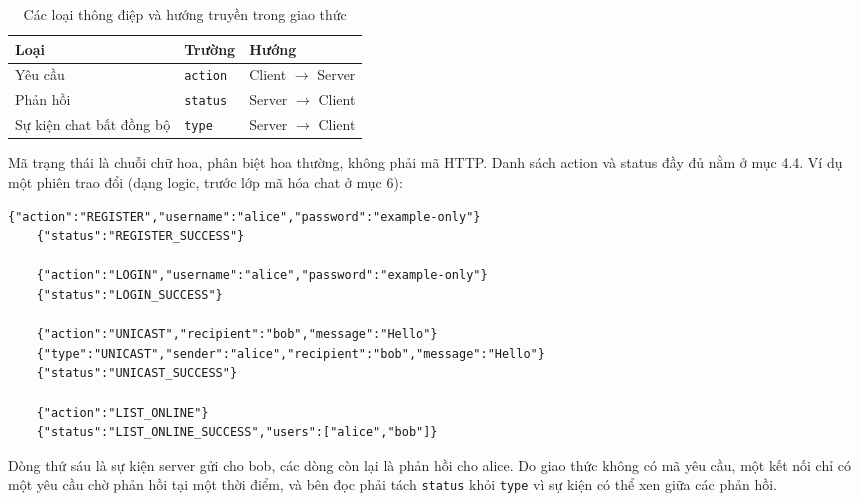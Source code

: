 \begin{table}[H]
    \centering
    \renewcommand{\arraystretch}{1.3}

    \begin{tabular}{@{} l l l @{}}
        \toprule
        \textbf{Loại} & \textbf{Trường} & \textbf{Hướng} \\
        \midrule
        Yêu cầu                  & \texttt{action} & Client $\rightarrow$ Server \\
        Phản hồi                 & \texttt{status} & Server $\rightarrow$ Client \\
        Sự kiện chat bất đồng bộ & \texttt{type}   & Server $\rightarrow$ Client \\
        \bottomrule
    \end{tabular}
    \caption{Các loại thông điệp và hướng truyền trong giao thức}
\end{table}

Mã trạng thái là chuỗi chữ hoa, phân biệt hoa thường, không phải mã HTTP. Danh sách action và status đầy đủ nằm ở mục 4.4. Ví dụ một phiên trao đổi (dạng logic, trước lớp mã hóa chat ở mục 6):

\begin{lstlisting}[style=json, caption={Ví dụ trao đổi thông điệp JSON giữa Client và Server}]
    {"action":"REGISTER","username":"alice","password":"example-only"}
    {"status":"REGISTER_SUCCESS"}

    {"action":"LOGIN","username":"alice","password":"example-only"}
    {"status":"LOGIN_SUCCESS"}

    {"action":"UNICAST","recipient":"bob","message":"Hello"}
    {"type":"UNICAST","sender":"alice","recipient":"bob","message":"Hello"}
    {"status":"UNICAST_SUCCESS"}

    {"action":"LIST_ONLINE"}
    {"status":"LIST_ONLINE_SUCCESS","users":["alice","bob"]}
\end{lstlisting}

Dòng thứ sáu là sự kiện server gửi cho bob, các dòng còn lại là phản hồi cho alice. Do giao thức không có mã yêu cầu, một kết nối chỉ có một yêu cầu chờ phản hồi tại một thời điểm, và bên đọc phải tách \texttt{status} khỏi \texttt{type} vì sự kiện có thể xen giữa các phản hồi.


